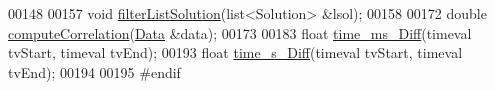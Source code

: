\begin{DoxyCode}
00148 
00157 \textcolor{keywordtype}{void} \hyperlink{group__generating_ga004bba79a35c68875ca45c4b14fd7583}{filterListSolution}(list<Solution> &lsol);
00158 
00172 \textcolor{keywordtype}{double} \hyperlink{group__others_gad3779b4abef4e115bc1fc6e67bdd3669}{computeCorrelation}(\hyperlink{classData}{Data} &data);
00173 
00183 \textcolor{keywordtype}{float} \hyperlink{group__others_ga06e4b113ea522684f94ae160c5097dd3}{time_ms_Diff}(timeval tvStart, timeval tvEnd);
00193 \textcolor{keywordtype}{float} \hyperlink{group__others_ga1203168170e0c71b755ee4f7a99fd671}{time_s_Diff}(timeval tvStart, timeval tvEnd);
00194 
00195 \textcolor{preprocessor}{#endif}
\end{DoxyCode}
